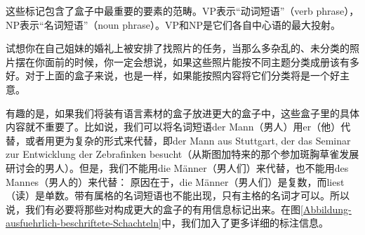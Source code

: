 这些标记包含了盒子中最重要的要素的范畴。VP表示“动词短语”（verb phrase），NP表示“名词短语”（noun phrase）。VP和NP是它们各自中心语的最大投射。

试想你在自己姐妹的婚礼上被安排了找照片的任务，当那么多杂乱的、未分类的照片摆在你面前的时候，你一定会想说，如果这些照片能按不同主题分类成册该有多好。对于上面的盒子来说，也是一样，如果能按照内容将它们分类将是一个好主意。

有趣的是，如果我们将装有语言素材的盒子放进更大的盒子中，这些盒子里的具体内容就不重要了。比如说，我们可以将名词短语der Mann（男人）用er（他）代替，或者用更为复杂的形式来代替，即der Mann aus Stuttgart, der das Seminar zur Entwicklung der Zebrafinken besucht（从斯图加特来的那个参加斑胸草雀发展研讨会的男人）。但是，我们不能用die Männer（男人们）来代替，也不能用des Mannes（男人的）来代替：
\eal 
{} 
\zl 
原因在于，die Männer（男人们）是复数，而liest（读）是单数。带有属格的名词短语也不能出现，只有主格的名词才可以。所以说，我们有必要将那些对构成更大的盒子的有用信息标记出来。在图\vref{Abbildung-ausfuehrlich-beschriftete-Schachteln}中，我们加入了更多详细的标注信息。

